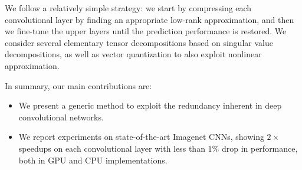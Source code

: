 We follow a relatively simple strategy: we start by compressing each 
convolutional layer by finding an appropriate low-rank approximation, 
and then we fine-tune the upper layers until the prediction performance 
is restored. We consider several elementary tensor decompositions based 
on singular value decompositions, as well as vector quantization to 
also exploit nonlinear approximation. 

In summary, our main contributions are:
\begin{itemize}
\item We present a generic method to exploit the redundancy inherent in deep convolutional networks.
\item We report experiments on state-of-the-art Imagenet CNNs, showing $2\times$ speedups on each 
	convolutional layer with less than $1\%$ drop in performance, both in GPU and CPU implementations.
\end{itemize}





